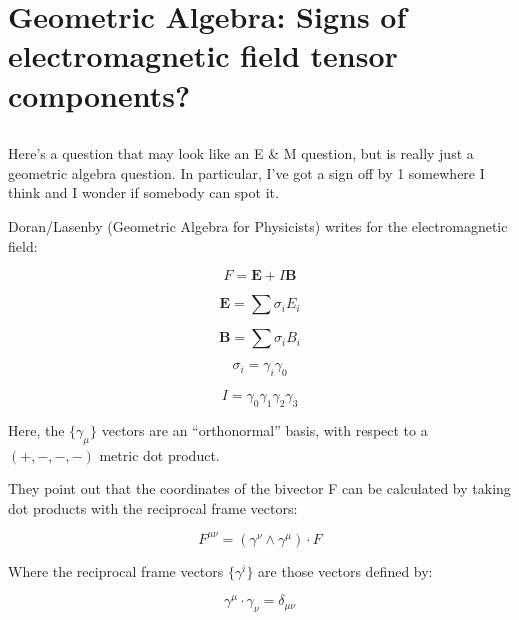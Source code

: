 
%

%
%

\chapter{Geometric Algebra: Signs of electromagnetic field tensor components? }
\date{ May 30, 2008.  $RCSfile: emTensor.tex,v $ Last $Revision: 1.8 $ $Date: 2009/06/11 17:00:37 $ }



\section{}

Here's a question that may look like an E \& M question, but is really just a geometric algebra question.  In particular, I've got a sign off by 1 somewhere I think and I wonder if somebody can spot it.

Doran/Lasenby (Geometric Algebra for Physicists) writes for the electromagnetic field:

\[
F = \mathbf{E} + I\mathbf{B}
\]

\[
\mathbf{E} = \sum \sigma_i E_i
\]

\[
\mathbf{B} = \sum \sigma_i B_i
\]

\[
\sigma_i = \gamma_i \gamma_0
\]

\[
I = \gamma_0 \gamma_1 \gamma_2 \gamma_3
\]

Here, the $\{\gamma_\mu\}$ vectors are an ``orthonormal'' basis, with respect to a $(+,-,-,-)$ metric dot product.

They point out that the coordinates of the bivector F can be calculated by taking dot products with the reciprocal frame vectors:

\[
F^{\mu\nu} = (\gamma^\nu \wedge \gamma^\mu) \cdot F
\]

Where the reciprocal frame vectors $\{\gamma^i\}$ are those vectors defined by:

\[
\gamma^\mu \cdot \gamma_\nu = \delta_{\mu\nu}
\]

